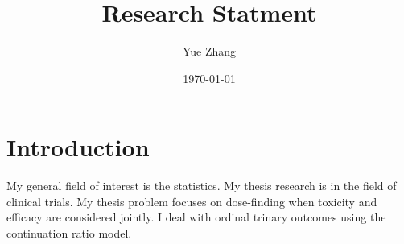 \documentclass[12pt]{article}
\begin{document}
 

\title{Research Statment}
\author{Yue Zhang }
\date{\today}

\maketitle
\section{Introduction}
My general field of interest is the statistics. My thesis research is in the field of clinical trials. My thesis problem focuses on dose-finding when toxicity and efficacy are considered jointly. I deal with ordinal trinary outcomes using the continuation ratio model. 
\end{document}
